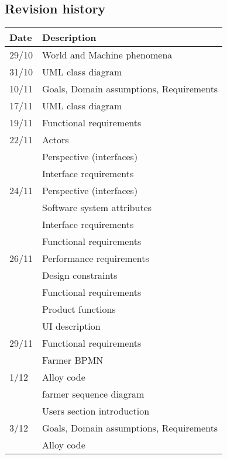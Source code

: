 \subsection{Revision history}
\label{sec:history}
\begin{center}
    \setlength\arrayrulewidth{1pt}
    \begin{longtable}{ll}
        
        \hline
        \rowcolor{myblue}\color{white}Date & \color{white}Description \\
        \hline
        29/10	&	World and Machine phenomena\\
        \hline
        31/10	&	UML	class diagram\\
        \hline
        10/11	&	Goals, Domain assumptions, Requirements	\\
        \hline
        17/11	&	UML	class diagram\\
        \hline
        19/11	&	Functional requirements	\\
        \hline
        22/11	&	Actors\\
        	&	Perspective (interfaces)\\
        	&	Interface requirements\\
        \hline
        24/11	&	Perspective (interfaces)		\\
        	&	Software system attributes	\\
        	&	Interface requirements	\\
        	&	Functional requirements	\\
        \hline
        26/11	&	Performance requirements	\\
        	&	Design constraints	\\
        	&	Functional requirements\\
        	&	Product functions	\\
        	&	UI description	\\
        \hline
        29/11	&	Functional requirements	\\
        	&	Farmer BPMN\\
        \hline
        1/12	&	Alloy code\\
        	&	farmer sequence diagram	\\
        	&	Users section introduction	\\
        \hline
        3/12	&	Goals, Domain assumptions, Requirements	\\
        	&	Alloy code \\

\end{longtable}
\end{center}
